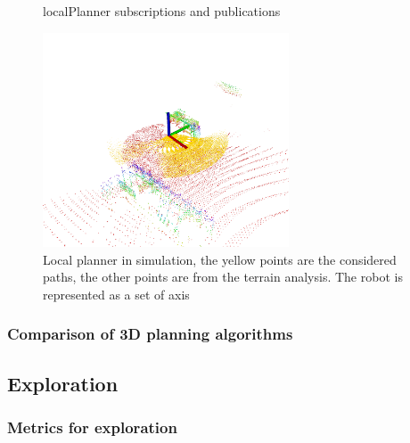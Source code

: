 \documentclass[11pt]{article}
\begin{document}
        
        \begin{figure}[h]
            \centering
            \resizebox{0.6\textwidth}{!}{%
            
            }   
            \caption{localPlanner subscriptions and publications}
            \label{fig:local_planner}
        \end{figure}
        
        \begin{figure}[h!]
            \centering
            \includegraphics[width=0.65\textwidth]{Images/localPlannerSimCropped.png}
            \caption{Local planner in simulation, the yellow points are the considered paths, the other points are from the terrain analysis. The robot is represented as a set of axis}
            \label{fig:local_planner_sim}
        \end{figure}
        
        
        
        \subsubsection{Comparison of 3D planning algorithms}

        

    \subsection{Exploration}
        \subsubsection{Metrics for exploration}
\end{document}
